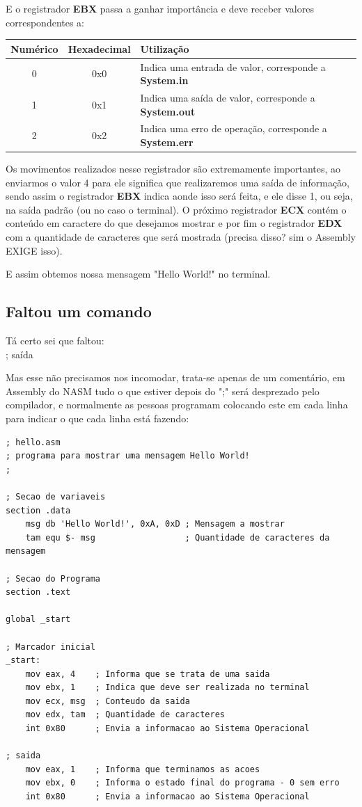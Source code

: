 E o registrador \textbf{EBX} passa a ganhar importância e deve receber valores correspondentes a:
\begin{table}[H]
	\centering 
	\begin{tabular}{c | c | l }
		\textbf{Numérico} & \textbf{Hexadecimal} & \textbf{Utilização} \\ \hline
		0 & 0x0 & Indica uma entrada de valor, corresponde a \textbf{System.in} \\
		1 & 0x1 & Indica uma saída de valor, corresponde a \textbf{System.out} \\
		2 & 0x2 & Indica uma erro de operação, corresponde a \textbf{System.err}
	\end{tabular}
\end{table}

Os movimentos realizados nesse registrador são extremamente importantes, ao enviarmos o valor 4 para ele significa que realizaremos uma saída de informação, sendo assim o registrador \textbf{EBX} indica aonde isso será feita, e ele disse 1, ou seja, na saída padrão (ou no caso o terminal). O próximo registrador \textbf{ECX} contém o conteúdo em caractere do que desejamos mostrar e por fim o registrador \textbf{EDX} com a quantidade de caracteres que será mostrada (precisa disso? sim o Assembly EXIGE isso).

E assim obtemos nossa mensagem "Hello World!" no terminal.

\subsection{Faltou um comando}

Tá certo sei que faltou: \\
{\ttfamily ; saída}

Mas esse não precisamos nos incomodar, trata-se apenas de um comentário, em Assembly do NASM tudo o que estiver depois do ";" será desprezado pelo compilador, e normalmente as pessoas programam colocando este em cada linha para indicar o que cada linha está fazendo:
\begin{lstlisting}[]
; hello.asm
; programa para mostrar uma mensagem Hello World!
;

; Secao de variaveis
section .data
	msg db 'Hello World!', 0xA, 0xD ; Mensagem a mostrar
	tam equ $- msg                  ; Quantidade de caracteres da mensagem
	
; Secao do Programa	
section .text
	
global _start
	
; Marcador inicial	
_start:
	mov eax, 4    ; Informa que se trata de uma saida
	mov ebx, 1    ; Indica que deve ser realizada no terminal
	mov ecx, msg  ; Conteudo da saida
	mov edx, tam  ; Quantidade de caracteres
	int 0x80      ; Envia a informacao ao Sistema Operacional
	
; saida
	mov eax, 1    ; Informa que terminamos as acoes
	mov ebx, 0    ; Informa o estado final do programa - 0 sem erro
	int 0x80      ; Envia a informacao ao Sistema Operacional
\end{lstlisting}
 
